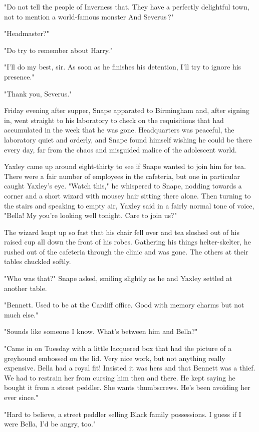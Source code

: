 "Do not tell the people of Inverness that. They have a perfectly delightful town, not to mention a world-famous monster{\el} And Severus{\el}\,?"

"Headmaster?"

"Do try to remember about Harry."

"I'll do my best, sir. As soon as he finishes his detention, I'll try to ignore his presence."

"Thank you, Severus."

Friday evening after supper, Snape apparated to Birmingham and, after signing in, went straight to his laboratory to check on the requisitions that had accumulated in the week that he was gone. Headquarters was peaceful, the laboratory quiet and orderly, and Snape found himself wishing he could be there every day, far from the chaos and misguided malice of the adolescent world.

Yaxley came up around eight-thirty to see if Snape wanted to join him for tea. There were a fair number of employees in the cafeteria, but one in particular caught Yaxley's eye. "Watch this," he whispered to Snape, nodding towards a corner and a short wizard with mousey hair sitting there alone. Then turning to the stairs and speaking to empty air, Yaxley said in a fairly normal tone of voice, "Bella! My you're looking well tonight. Care to join us?"

The wizard leapt up so fast that his chair fell over and tea sloshed out of his raised cup all down the front of his robes. Gathering his things helter-skelter, he rushed out of the cafeteria through the clinic and was gone. The others at their tables chuckled softly.

"Who was that?" Snape asked, smiling slightly as he and Yaxley settled at another table.

"Bennett. Used to be at the Cardiff office. Good with memory charms but not much else."

"Sounds like someone I know. What's between him and Bella?"

"Came in on Tuesday with a little lacquered box that had the picture of a greyhound embossed on the lid. Very nice work, but not anything really expensive. Bella had a royal fit! Insisted it was hers and that Bennett was a thief. We had to restrain her from cursing him then and there. He kept saying he bought it from a street peddler. She wants thumbscrews. He's been avoiding her ever since."

"Hard to believe, a street peddler selling Black family possessions. I guess if I were Bella, I'd be angry, too."

